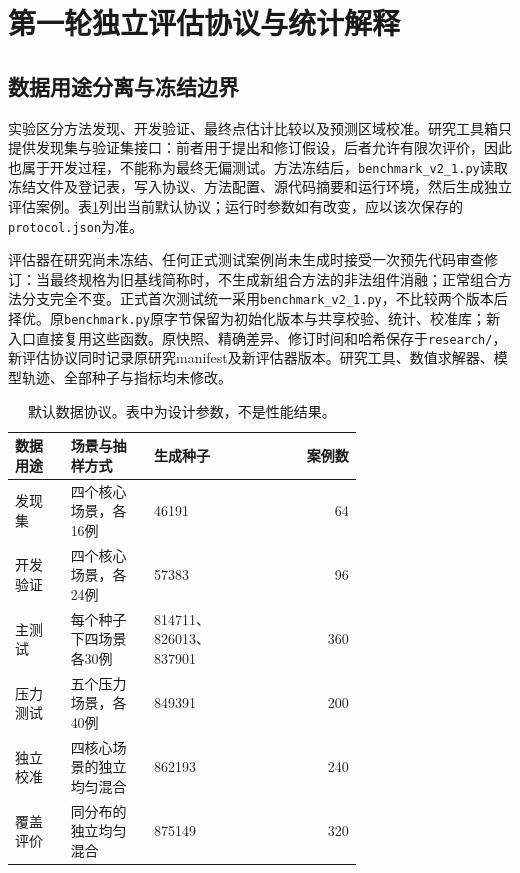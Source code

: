 \section{第一轮独立评估协议与统计解释}
\label{sec:experimental-protocol}

\subsection{数据用途分离与冻结边界}

实验区分方法发现、开发验证、最终点估计比较以及预测区域校准。研究工具箱只提供发现集与验证集接口：前者用于提出和修订假设，后者允许有限次评价，因此也属于开发过程，不能称为最终无偏测试。方法冻结后，\texttt{benchmark\_v2\_1.py}读取冻结文件及登记表，写入协议、方法配置、源代码摘要和运行环境，然后生成独立评估案例。表\ref{tab:dataset-protocol}列出当前默认协议；运行时参数如有改变，应以该次保存的\texttt{protocol.json}为准。

评估器在研究尚未冻结、任何正式测试案例尚未生成时接受一次预先代码审查修订：当最终规格为旧基线简称时，不生成新组合方法的非法组件消融；正常组合方法分支完全不变。正式首次测试统一采用\texttt{benchmark\_v2\_1.py}，不比较两个版本后择优。原\texttt{benchmark.py}原字节保留为初始化版本与共享校验、统计、校准库；新入口直接复用这些函数。原快照、精确差异、修订时间和哈希保存于\texttt{research/}，新评估协议同时记录原研究manifest及新评估器版本。研究工具、数值求解器、模型轨迹、全部种子与指标均未修改。

\begin{table}[tbp]
  \centering
  \caption{默认数据协议。表中为设计参数，不是性能结果。}
  \label{tab:dataset-protocol}
  \begin{tabular}{p{0.16\linewidth}p{0.24\linewidth}p{0.29\linewidth}r}
    \toprule
    数据用途 & 场景与抽样方式 & 生成种子 & 案例数\\
    \midrule
    发现集 & 四个核心场景，各16例 & 46191 & 64\\
    开发验证 & 四个核心场景，各24例 & 57383 & 96\\
    主测试 & 每个种子下四场景各30例 & 814711、826013、837901 & 360\\
    压力测试 & 五个压力场景，各40例 & 849391 & 200\\
    独立校准 & 四核心场景的独立均匀混合 & 862193 & 240\\
    覆盖评价 & 同分布的独立均匀混合 & 875149 & 320\\
    \bottomrule
  \end{tabular}
\end{table}

